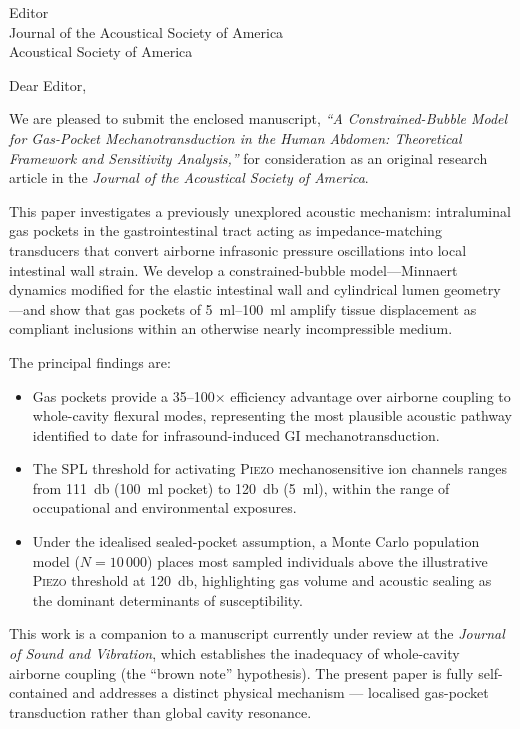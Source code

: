 \documentclass[12pt]{letter}
\date{\today}
\begin{document}
\begin{letter}{%
  Editor\\
  Journal of the Acoustical Society of America\\
  Acoustical Society of America%
}

\opening{Dear Editor,}

We are pleased to submit the enclosed manuscript, \emph{``A Constrained-Bubble
Model for Gas-Pocket Mechanotransduction in the Human Abdomen: Theoretical
Framework and Sensitivity Analysis,''} for consideration as an original
research article in the \emph{Journal of the Acoustical Society of America}.

This paper investigates a previously unexplored acoustic mechanism:
intraluminal gas pockets in the gastrointestinal tract acting as
impedance-matching transducers that convert airborne infrasonic pressure
oscillations into local intestinal wall strain.  We develop a
constrained-bubble model---Minnaert dynamics modified for the elastic
intestinal wall and cylindrical lumen geometry---and show that gas pockets of
\SIrange{5}{100}{\milli\litre} amplify tissue displacement as compliant
inclusions within an otherwise nearly incompressible medium.

The principal findings are:
\begin{itemize}
  \item Gas pockets provide a 35--100$\times$ efficiency advantage over
    airborne coupling to whole-cavity flexural modes, representing the most
    plausible acoustic pathway identified to date for infrasound-induced GI
    mechanotransduction.
  \item The SPL threshold for activating \textsc{Piezo} mechanosensitive ion
    channels ranges from \SI{111}{\decibel} (\SI{100}{\milli\litre} pocket)
    to \SI{120}{\decibel} (\SI{5}{\milli\litre}), within the range of
    occupational and environmental exposures.
  \item Under the idealised sealed-pocket assumption, a Monte Carlo
    population model ($N = 10\,000$) places most sampled individuals
    above the illustrative \textsc{Piezo} threshold at
    \SI{120}{\decibel}, highlighting gas volume and acoustic sealing as
    the dominant determinants of susceptibility.
\end{itemize}
This work is a companion to a manuscript currently under review at the
\emph{Journal of Sound and Vibration}, which establishes the inadequacy of
whole-cavity airborne coupling (the ``brown note'' hypothesis).  The present
paper is fully self-contained and addresses a distinct physical mechanism
--- localised gas-pocket transduction rather than global cavity resonance.


\end{letter}
\end{document}
